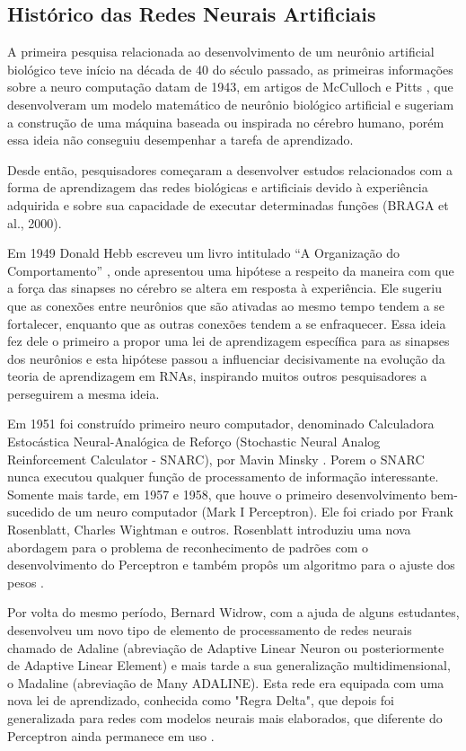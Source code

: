 \subsection{Histórico das Redes Neurais Artificiais}

A primeira pesquisa relacionada ao desenvolvimento de um neurônio artificial biológico teve início na década de 40 do século passado, as primeiras informações sobre a neuro computação datam de 1943, em artigos de McCulloch e Pitts \cite{mcculloch1943logical}, que desenvolveram um modelo matemático de neurônio biológico artificial e sugeriam a construção de uma máquina baseada ou inspirada no cérebro humano, porém essa ideia não conseguiu desempenhar a tarefa de aprendizado.

Desde então, pesquisadores começaram a desenvolver estudos relacionados com a forma de aprendizagem das redes biológicas e artificiais devido à experiência adquirida e sobre sua capacidade de executar determinadas funções (BRAGA et al., 2000).

Em 1949 Donald Hebb escreveu um livro intitulado “A Organização do Comportamento” \cite{hebb1949organization}, onde apresentou uma hipótese a respeito da maneira com que a força das sinapses no cérebro se altera em resposta à experiência. Ele sugeriu que as conexões entre neurônios que são ativadas ao mesmo tempo tendem a se fortalecer, enquanto que as outras conexões tendem a se enfraquecer. Essa ideia fez dele o primeiro a propor uma lei de aprendizagem específica para as sinapses dos neurônios e esta hipótese passou a influenciar decisivamente na evolução da teoria de aprendizagem em RNAs, inspirando muitos outros pesquisadores a perseguirem a mesma ideia.

Em 1951 foi construído primeiro neuro computador, denominado Calculadora Estocástica Neural-Analógica de Reforço (Stochastic Neural Analog Reinforcement Calculator - SNARC), por Mavin Minsky \cite{minsky1952neural}. Porem o SNARC nunca executou qualquer função de processamento de informação interessante. Somente mais tarde, em 1957 e 1958, que houve o primeiro desenvolvimento bem-sucedido de um neuro computador (Mark I Perceptron). Ele foi criado por Frank Rosenblatt, Charles Wightman e outros. Rosenblatt introduziu uma nova abordagem para o problema de reconhecimento de padrões com o desenvolvimento do Perceptron e também propôs um algoritmo para o ajuste dos pesos \cite{rosenblatt1958perceptron}.

Por volta do mesmo período, Bernard Widrow, com a ajuda de alguns estudantes, desenvolveu um novo tipo de elemento de processamento de redes neurais chamado de Adaline (abreviação de Adaptive Linear Neuron ou posteriormente de Adaptive Linear Element) e mais tarde a sua generalização multidimensional, o Madaline (abreviação de Many ADALINE)\cite{widrow1960adaptive}. Esta rede era equipada com uma nova lei de aprendizado, conhecida como "Regra Delta", que depois foi generalizada para redes com modelos neurais mais elaborados, que diferente do Perceptron ainda permanece em uso \cite{furtado2019redes}.

